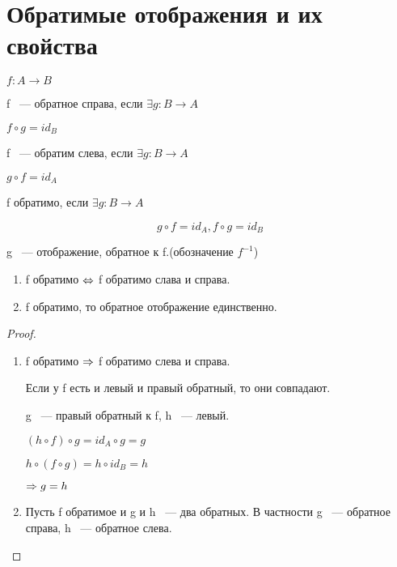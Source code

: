 ﻿\section{Обратимые отображения и их свойства}

$f: A \to B$

\begin{Def}
f ~--- обратное справа, если $\exists g: B \to A$

$f \circ g = id_B$

f ~--- обратим слева, если $\exists g: B \to A$

$g \circ f = id_A$

f обратимо, если $\exists g: B \to A$

$$g \circ f = id_A, f \circ g = id_B$$

g ~--- отображение, обратное к f.(обозначение $f^{-1}$)
\end{Def}

\begin{theorem}{}

\begin{enumerate}
\item f обратимо $\Leftrightarrow$ f обратимо слава и справа.
\item f обратимо, то обратное отображение единственно.
\end{enumerate}

\end{theorem}

\begin{proof}
\begin{enumerate}
\item f обратимо $\Rightarrow$ f обратимо слева и справа.

Если у f есть и левый и правый обратный, то они совпадают. 

g ~--- правый обратный к f, h ~--- левый.

$(h \circ f) \circ g = id_A \circ g = g$

$h \circ (f \circ g) = h \circ id_B = h$

$\Rightarrow g = h$

\item Пусть f обратимое и g и h ~--- два обратных. В частности g ~--- обратное справа, h ~--- обратное слева.
\end{enumerate}
\end{proof}